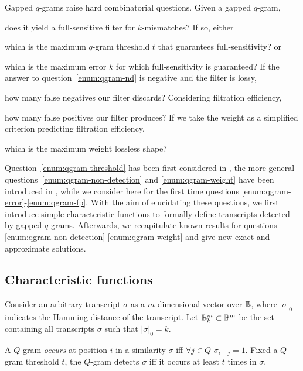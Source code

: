
Gapped $q$-grams raise hard combinatorial questions. Given a gapped $q$-gram, 
\begin{inparaenum}[(i)]
\item \label{enum:qgram-non-detection} does it yield a full-sensitive filter for $k$-mismatches? If so, either
\item \label{enum:qgram-threshold} which is the maximum $q$-gram threshold $t$ that guarantees full-sensitivity? or 
\item \label{enum:qgram-error} which is the maximum error $k$ for which full-sensitivity is guaranteed?
If the answer to question~\ref{enum:qgram-nd} is negative and the filter is lossy,
\item \label{enum:qgram-fn} how many false negatives our filter discards?
Considering filtration efficiency,
\item \label{enum:qgram-fp} how many false positives our filter produces?
If we take the weight as a simplified criterion predicting filtration efficiency, 
\item \label{enum:qgram-weight} which is the maximum weight lossless shape?
\end{inparaenum}

Question~\ref{enum:qgram-threshold} has been first considered in \citep{Burkhardt2001,Kucherov2005},
the more general questions~\ref{enum:qgram-non-detection} and \ref{enum:qgram-weight} have been introduced in \citep{Nicolas2005}, while we consider here for the first time questions \ref{enum:qgram-error}-\ref{enum:qgram-fp}.
With the aim of elucidating these questions, we first introduce simple characteristic functions to formally define transcripts detected by gapped $q$-grams.
Afterwards, we recapitulate known results for questions \ref{enum:qgram-non-detection}-\ref{enum:qgram-weight} and give new exact and approximate solutions.

\subsection{Characteristic functions}

Consider an arbitrary transcript $\sigma$ as a $m$-dimensional vector over $\mathbb {B}$, where $|\sigma|_0$ indicates the Hamming distance of the transcript.
Let $\mathbb {B}^m_k \subset \mathbb {B}^m$ be the set containing all transcripts $\sigma$ such that $|\sigma|_0 = k$.

\begin{definition}
A $Q$-gram \emph{occurs} at position $i$ in a similarity $\sigma$ iff $\forall j \in Q$ $\sigma_{i+j}=1$.
Fixed a $Q$-gram threshold $t$, the $Q$-gram detects $\sigma$ iff it occurs at least $t$ times in $\sigma$.
\end{definition}

